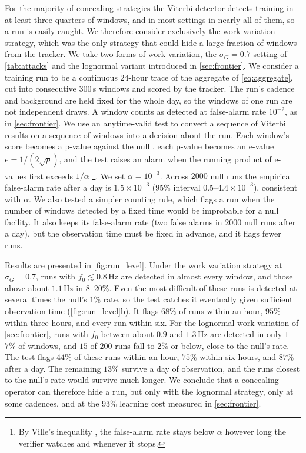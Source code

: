 \documentclass{article}
\begin{document}
For the majority of concealing strategies the Viterbi detector detects training in at least three quarters of windows, and in most settings in nearly all of them, so a run is easily caught. We therefore consider exclusively the work variation strategy, which was the only strategy that could hide a large fraction of windows from the tracker. We take two forms of work variation, the $\sigma_G = 0.7$ setting of \cref{tab:attacks} and the
lognormal variant introduced in \ref{sec:frontier}. We consider a training run to be a continuous $24$-hour trace of the aggregate of \cref{eq:aggregate}, cut into consecutive
$300$\,s windows and scored by the tracker. The run's cadence and background are
held fixed for the whole day, so the windows of one run are not independent
draws. A window counts as detected at false-alarm rate $10^{-2}$, as in
\cref{sec:frontier}. We use an anytime-valid test \citep{ramdas2023savi} to convert a sequence of Viterbi results on a sequence of windows into a decision about the run. Each window's score becomes a p-value against the null \citep{vovk2005algorithmic}, each p-value
becomes an e-value $e = 1/(2\sqrt{p})$, and the test raises an alarm when the
running product of e-values first exceeds $1/\alpha$ \footnote{By Ville's inequality
\citep{ville1939etude}, the false-alarm rate stays below $\alpha$ however long the
verifier watches and whenever it stops.}. We set $\alpha = 10^{-3}$. Across $2000$
null runs the empirical false-alarm rate after a day is $1.5 \times 10^{-3}$
($95\%$ interval $0.5$--$4.4 \times 10^{-3}$), consistent with $\alpha$. We also tested a simpler counting rule, which flags a run when the number of
windows detected by a fixed time would be improbable for a null facility. It also
keeps its false-alarm rate (two false alarms in $2000$ null runs after a day), but
the observation time must be fixed in advance, and it flags fewer runs.


Results are presented in \cref{fig:run_level}. Under the work variation strategy at $\sigma_G = 0.7$, runs with $f_0 \lesssim 0.8$\,Hz are detected in almost every window, and those above about $1.1$\,Hz in $8$--$20\%$. Even the most difficult of these runs is detected at several times the null's $1\%$ rate, so the test
catches it eventually given sufficient observation time (\cref{fig:run_level}b). It flags $68\%$ of runs within an hour, $95\%$ within three hours, and every run within six. For the lognormal work variation of \cref{sec:frontier}, runs with $f_0$ between about $0.9$ and $1.3$\,Hz are detected in only $1$--$7\%$ of windows, and $15$ of $200$ runs fall to $2\%$
or below, close to the null's rate. The test flags $44\%$ of these runs within an
hour, $75\%$ within six hours, and $87\%$ after a day. The remaining $13\%$
survive a day of observation, and the runs closest to the null's rate would
survive much longer. We conclude that a concealing operator can therefore hide a run, but only with
the lognormal strategy, only at some cadences, and at the $93\%$ learning cost
measured in \cref{sec:frontier}.
\end{document}
